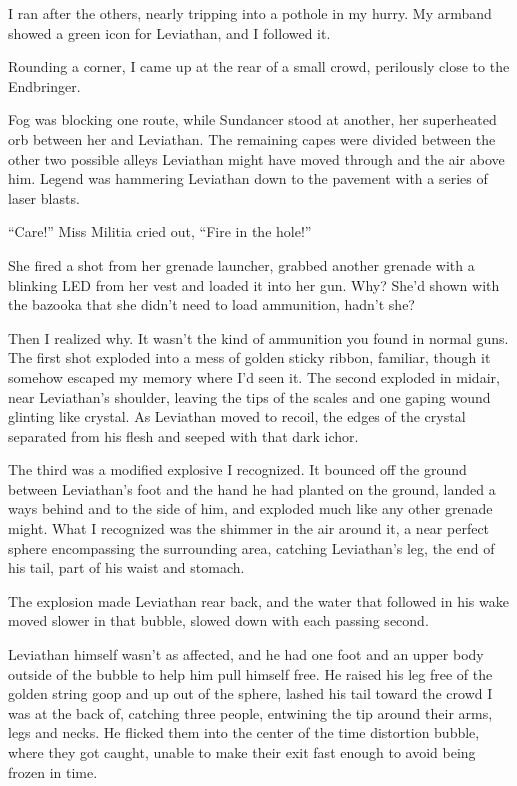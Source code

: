 I ran after the others, nearly tripping into a pothole in my hurry.  My armband showed a green icon for Leviathan, and I followed it.



Rounding a corner, I came up at the rear of a small crowd, perilously close to the Endbringer.



Fog was blocking one route, while Sundancer stood at another, her superheated orb between her and Leviathan.  The remaining capes were divided between the other two possible alleys Leviathan might have moved through and the air above him.  Legend was hammering Leviathan down to the pavement with a series of laser blasts.



``Care!'' Miss Militia cried out, ``Fire in the hole!''



She fired a shot from her grenade launcher, grabbed another grenade with a blinking LED from her vest and loaded it into her gun.  Why?  She'd shown with the bazooka that she didn't need to load ammunition, hadn't she?



Then I realized why.  It wasn't the kind of ammunition you found in normal guns.  The first shot exploded into a mess of golden sticky ribbon, familiar, though it somehow escaped my memory where I'd seen it.  The second exploded in midair, near Leviathan's shoulder, leaving the tips of the scales and one gaping wound glinting like crystal.  As Leviathan moved to recoil, the edges of the crystal separated from his flesh and seeped with that dark ichor.



The third was a modified explosive I recognized.  It bounced off the ground between Leviathan's foot and the hand he had planted on the ground, landed a ways behind and to the side of him, and exploded much like any other grenade might.  What I recognized was the shimmer in the air around it, a near perfect sphere encompassing the surrounding area, catching Leviathan's leg, the end of his tail, part of his waist and stomach.



The explosion made Leviathan rear back, and the water that followed in his wake moved slower in that bubble, slowed down with each passing second.



Leviathan himself wasn't as affected, and he had one foot and an upper body outside of the bubble to help him pull himself free.  He raised his leg free of the golden string goop and up out of the sphere, lashed his tail toward the crowd I was at the back of, catching three people, entwining the tip around their arms, legs and necks.  He flicked them into the center of the time distortion bubble, where they got caught, unable to make their exit fast enough to avoid being frozen in time.




